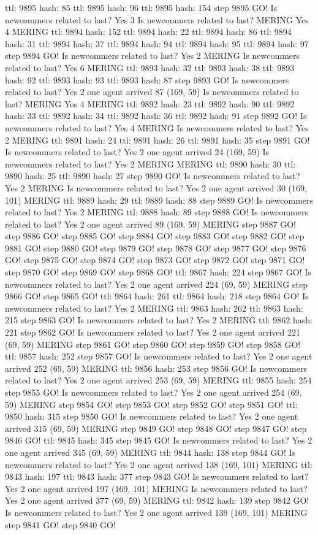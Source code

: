 ttl: 9895 hash: 85 ttl: 9895 hash: 96 ttl: 9895 hash: 154 step 9895 GO! Is newcommers related to last? Yes 3 Is newcommers related to last? MERING Yes 4 MERING ttl: 9894 hash: 152 ttl: 9894 hash: 22 ttl: 9894 hash: 86 ttl: 9894 hash: 31 ttl: 9894 hash: 37 ttl: 9894 hash: 94 ttl: 9894 hash: 95 ttl: 9894 hash: 97 step 9894 GO! Is newcommers related to last? Yes 2 MERING Is newcommers related to last? Yes 6 MERING ttl: 9893 hash: 32 ttl: 9893 hash: 38 ttl: 9893 hash: 92 ttl: 9893 hash: 93 ttl: 9893 hash: 87 step 9893 GO! Is newcommers related to last? Yes 2 one agent arrived 87 (169, 59) Is newcommers related to last? MERING Yes 4 MERING ttl: 9892 hash: 23 ttl: 9892 hash: 90 ttl: 9892 hash: 33 ttl: 9892 hash: 34 ttl: 9892 hash: 36 ttl: 9892 hash: 91 step 9892 GO! Is newcommers related to last? Yes 4 MERING Is newcommers related to last? Yes 2 MERING ttl: 9891 hash: 24 ttl: 9891 hash: 26 ttl: 9891 hash: 35 step 9891 GO! Is newcommers related to last? Yes 2 one agent arrived 24 (169, 59) Is newcommers related to last? Yes 2 MERING MERING ttl: 9890 hash: 30 ttl: 9890 hash: 25 ttl: 9890 hash: 27 step 9890 GO! Is newcommers related to last? Yes 2 MERING Is newcommers related to last? Yes 2 one agent arrived 30 (169, 101) MERING ttl: 9889 hash: 29 ttl: 9889 hash: 88 step 9889 GO! Is newcommers related to last? Yes 2 MERING ttl: 9888 hash: 89 step 9888 GO! Is newcommers related to last? Yes 2 one agent arrived 89 (169, 59) MERING step 9887 GO! step 9886 GO! step 9885 GO! step 9884 GO! step 9883 GO! step 9882 GO! step 9881 GO! step 9880 GO! step 9879 GO! step 9878 GO! step 9877 GO! step 9876 GO! step 9875 GO! step 9874 GO! step 9873 GO! step 9872 GO! step 9871 GO! step 9870 GO! step 9869 GO! step 9868 GO! ttl: 9867 hash: 224 step 9867 GO! Is newcommers related to last? Yes 2 one agent arrived 224 (69, 59) MERING step 9866 GO! step 9865 GO! ttl: 9864 hash: 261 ttl: 9864 hash: 218 step 9864 GO! Is newcommers related to last? Yes 2 MERING ttl: 9863 hash: 262 ttl: 9863 hash: 215 step 9863 GO! Is newcommers related to last? Yes 2 MERING ttl: 9862 hash: 221 step 9862 GO! Is newcommers related to last? Yes 2 one agent arrived 221 (69, 59) MERING step 9861 GO! step 9860 GO! step 9859 GO! step 9858 GO! ttl: 9857 hash: 252 step 9857 GO! Is newcommers related to last? Yes 2 one agent arrived 252 (69, 59) MERING ttl: 9856 hash: 253 step 9856 GO! Is newcommers related to last? Yes 2 one agent arrived 253 (69, 59) MERING ttl: 9855 hash: 254 step 9855 GO! Is newcommers related to last? Yes 2 one agent arrived 254 (69, 59) MERING step 9854 GO! step 9853 GO! step 9852 GO! step 9851 GO! ttl: 9850 hash: 315 step 9850 GO! Is newcommers related to last? Yes 2 one agent arrived 315 (69, 59) MERING step 9849 GO! step 9848 GO! step 9847 GO! step 9846 GO! ttl: 9845 hash: 345 step 9845 GO! Is newcommers related to last? Yes 2 one agent arrived 345 (69, 59) MERING ttl: 9844 hash: 138 step 9844 GO! Is newcommers related to last? Yes 2 one agent arrived 138 (169, 101) MERING ttl: 9843 hash: 197 ttl: 9843 hash: 377 step 9843 GO! Is newcommers related to last? Yes 2 one agent arrived 197 (169, 101) MERING Is newcommers related to last? Yes 2 one agent arrived 377 (69, 59) MERING ttl: 9842 hash: 139 step 9842 GO! Is newcommers related to last? Yes 2 one agent arrived 139 (169, 101) MERING step 9841 GO! step 9840 GO! 